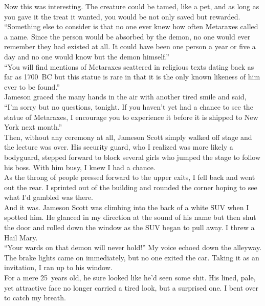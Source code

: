 \documentclass[a5paper]{scrartcl}
\begin{document}
Now this was interesting. The creature could be tamed, like a pet, and as long as you gave it the treat it wanted, you would be not only saved but rewarded. \\


\enquote{Something else to consider is that no one ever knew how often Metaraxes called a name. Since the person would be absorbed by the demon, no one would ever remember they had existed at all. It could have been one person a year or five a day and no one would know but the demon himself.}\\


\enquote{You will find mentions of Metaraxes scattered in religious texts dating back as far as 1700~BC but this statue is rare in that it is the only known likeness of him ever to be found.}\\


Jameson graced the many hands in the air with another tired smile and said, \enquote{I'm sorry but no questions, tonight. If you haven't yet had a chance to see the statue of Metaraxes, I encourage you to experience it before it is shipped to New York next month.}\\


Then, without any ceremony at all, Jameson Scott simply walked off stage and the lecture was over.  His security guard, who I realized was more likely a bodyguard, stepped forward to block several girls who jumped the stage to follow his boss. With him busy, I knew I had a chance.\\


As the throng of people pressed forward to the upper exits, I fell back and went out the rear. I sprinted out of the building and rounded the corner hoping to see what I'd gambled was there.\\


And it was. Jameson Scott was climbing into the back of a white SUV when I spotted him. He glanced in my direction at the sound of his name but then shut the door and rolled down the window as the SUV began to pull away. I threw a Hail Mary.\\


\enquote{Your wards on that demon will never hold!} My voice echoed down the alleyway.\\


The brake lights came on immediately, but no one exited the car. Taking it as an invitation, I ran up to his window.\\


For a mere 25~years old, he sure looked like he'd seen some shit. His lined, pale, yet attractive face no longer carried a tired look, but a surprised one. I bent over to catch my breath.\\
\end{document}
